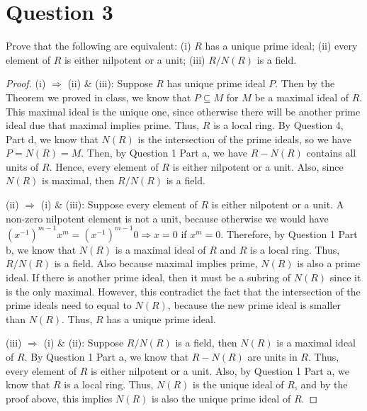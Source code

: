\section{Question 3}

\begin{question}
    Prove that the following are equivalent: (i) $R$ has a unique prime ideal; (ii) every element of $R$ is either nilpotent or a unit; (iii) $R / N(R)$ is a field.
\end{question}

\begin{answer}
    \begin{proof}
        (i) $\Rightarrow$ (ii) \& (iii): Suppose $R$ has unique prime ideal $P$. Then by the Theorem we proved in class, we know that $P \subseteq M$ for $M$ be a maximal ideal of $R$. This maximal ideal is the unique one, since otherwise there will be another prime ideal due that maximal implies prime. Thus, $R$ is a local ring. By Question 4, Part d, we know that $N(R)$ is the intersection of the prime ideals, so we have $P = N(R) = M$. Then, by Question 1 Part a, we have $R - N(R)$ contains all units of $R$. Hence, every element of $R$ is either nilpotent or a unit. Also, since $N(R)$ is maximal, then $R/N(R)$ is a field.
        
        (ii) $\Rightarrow$ (i) \& (iii): Suppose every element of $R$ is either nilpotent or a unit. A non-zero nilpotent element is not a unit, because otherwise we would have $(x^{-1})^{m-1}x^m = (x^{-1})^{m-1}0 \Rightarrow x = 0$ if $x^m = 0$. Therefore, by Question 1 Part b, we know that $N(R)$ is a maximal ideal of $R$ and $R$ is a local ring. Thus, $R/N(R)$ is a field. Also because maximal implies prime, $N(R)$ is also a prime ideal. If there is another prime ideal, then it must be a subring of $N(R)$ since it is the only maximal. However, this contradict the fact that the intersection of the prime ideals need to equal to $N(R)$, because the new prime ideal is smaller than $N(R)$. Thus, $R$ has a unique prime ideal.
        
        (iii) $\Rightarrow$ (i) \& (ii): Suppose $R/N(R)$ is a field, then $N(R)$ is a maximal ideal of $R$. By Question 1 Part a, we know that $R-N(R)$ are units in $R$. Thus, every element of $R$ is either nilpotent or a unit. Also, by Question 1 Part a, we know that $R$ is a local ring. Thus, $N(R)$ is the unique ideal of $R$, and by the proof above, this implies $N(R)$ is also the unique prime ideal of $R$.
    \end{proof}
\end{answer}